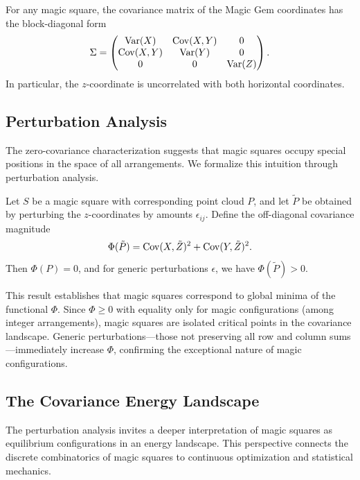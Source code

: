 \begin{corollary}
For any magic square, the covariance matrix of the Magic Gem coordinates has the block-diagonal form
\[
\Sigma = \begin{pmatrix}
\mathrm{Var}(X) & \mathrm{Cov}(X,Y) & 0 \\
\mathrm{Cov}(X,Y) & \mathrm{Var}(Y) & 0 \\
0 & 0 & \mathrm{Var}(Z)
\end{pmatrix}.
\]
In particular, the $z$-coordinate is uncorrelated with both horizontal coordinates.
\end{corollary}

\subsection{Perturbation Analysis}
\label{sec:perturbation}

The zero-covariance characterization suggests that magic squares occupy special positions 
in the space of all arrangements.
We formalize this intuition through perturbation analysis.

\begin{proposition}
\label{prop:local_opt}
Let $S$ be a magic square with corresponding point cloud $P$, 
and let $\tilde{P}$ be obtained by perturbing the $z$-coordinates by amounts $\epsilon_{ij}$.
Define the off-diagonal covariance magnitude
\[
\Phi(\tilde{P}) = \mathrm{Cov}(X, \tilde{Z})^2 + \mathrm{Cov}(Y, \tilde{Z})^2.
\]
Then $\Phi(P) = 0$, and for generic perturbations $\epsilon$, we have $\Phi(\tilde{P}) > 0$.
\end{proposition}

This result establishes that magic squares correspond to global minima of the functional $\Phi$.
Since $\Phi \geq 0$ with equality only for magic configurations (among integer arrangements),
magic squares are isolated critical points in the covariance landscape.
Generic perturbations---those not preserving all row and column sums---immediately increase $\Phi$,
confirming the exceptional nature of magic configurations.

\subsection{The Covariance Energy Landscape}
\label{sec:energy_landscape}

The perturbation analysis invites a deeper interpretation of magic squares 
as equilibrium configurations in an energy landscape.
This perspective connects the discrete combinatorics of magic squares 
to continuous optimization and statistical mechanics.


